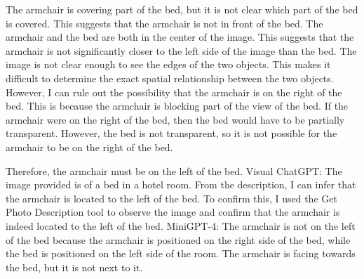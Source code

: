 \begin{enumerate}
    The armchair is covering part of the bed, but it is not clear which part of the bed is covered. This suggests that the armchair is not in front of the bed.
    The armchair and the bed are both in the center of the image. This suggests that the armchair is not significantly closer to the left side of the image than the bed.
    The image is not clear enough to see the edges of the two objects. This makes it difficult to determine the exact spatial relationship between the two objects.
    However, I can rule out the possibility that the armchair is on the right of the bed. This is because the armchair is blocking part of the view of the bed. If the armchair were on the right of the bed, then the bed would have to be partially transparent. However, the bed is not transparent, so it is not possible for the armchair to be on the right of the bed.

    Therefore, the armchair must be on the left of the bed.
    \subitem Visual ChatGPT: The image provided is of a bed in a hotel room. From the description, I can infer that the armchair is located to the left of the bed. To confirm this, I used the Get Photo Description tool to observe the image and confirm that the armchair is indeed located to the left of the bed.
    \subitem MiniGPT-4: The armchair is not on the left of the bed because the armchair is positioned on the right side of the bed, while the bed is positioned on the left side of the room. The armchair is facing towards the bed, but it is not next to it.
\end{enumerate}
